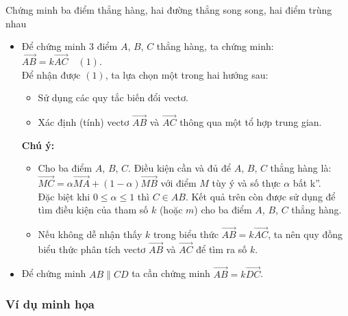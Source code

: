 \begin{dang}{Chứng minh ba điểm thẳng hàng, hai đường thẳng song song, hai điểm trùng nhau}%
	\begin{itemize}
		\item Để chứng minh $3$ điểm $A$, $B$, $C$ thẳng hàng, ta chứng minh: $\overrightarrow{AB}=k\overrightarrow{AC} \quad (1)$.\\
		Để nhận được $(1)$, ta lựa chọn một trong hai hướng sau:
		\begin{itemize}
			\item Sử dụng các quy tắc biến đổi vectơ.
			\item Xác định (tính) vectơ $\overrightarrow{AB}$ và $\overrightarrow{AC}$ thông qua một tổ hợp trung gian.
		\end{itemize} 
		\textbf{Chú ý:}
		\begin{itemize}
			\item Cho ba điểm $A$, $B$, $C$. Điều kiện cần và đủ để $A$, $B$, $C$ thẳng hàng là: $\overrightarrow{MC}=\alpha \overrightarrow{MA}+(1-\alpha) \overrightarrow{MB}$ với điểm $M$ tùy ý và số thực $\alpha$ bất k''. \\
			Đặc biệt khi $0 \le \alpha \le 1$ thì $C \in AB$. Kết quả trên còn được sử dụng để tìm điều kiện của tham số $k$ (hoặc $m$) cho ba điểm $A$, $B$, $C$ thẳng hàng.
			\item Nếu không dễ nhận thấy $k$ trong biểu thức $\overrightarrow{AB}=k \overrightarrow{AC}$, ta nên quy đồng biểu thức phân tích vectơ $\overrightarrow{AB}$ và $\overrightarrow{AC}$ để tìm ra số $k$. 
		\end{itemize}
		\item Để chứng minh $AB \parallel CD$ ta cần chứng minh $\overrightarrow{AB}=k \overrightarrow{DC}$.
	\end{itemize}
\end{dang}

\subsubsection{Ví dụ minh họa}

